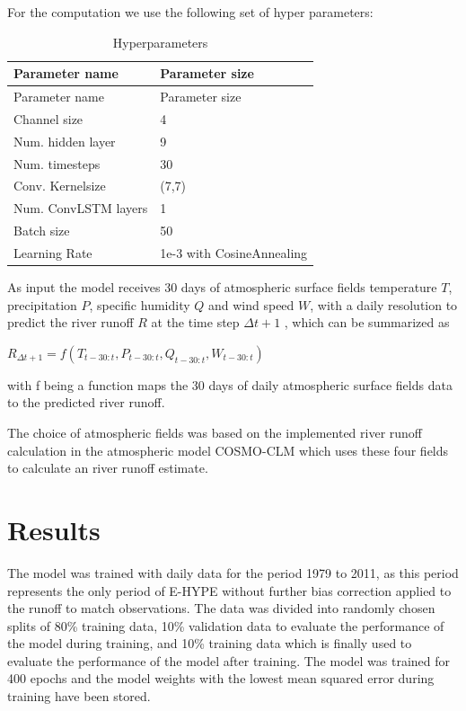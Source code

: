 \documentclass[
]{agujournal2019}
\begin{document}
For the computation we use the following set of hyper parameters:

\hypertarget{tbl-letters}{}
\begin{longtable}[]{@{}ll@{}}
\caption{\label{tbl-letters}Hyperparameters}\tabularnewline
\toprule()
Parameter name & Parameter size \\
\midrule()
\endfirsthead
\toprule()
Parameter name & Parameter size \\
\midrule()
\endhead
Channel size & 4 \\
Num. hidden layer & 9 \\
Num. timesteps & 30 \\
Conv. Kernelsize & (7,7) \\
Num. ConvLSTM layers & 1 \\
Batch size & 50 \\
Learning Rate & 1e-3 with CosineAnnealing \\
\bottomrule()
\end{longtable}

As input the model receives 30 days of atmospheric surface fields
temperature \(T\), precipitation \(P\), specific humidity \(Q\) and wind
speed \(W\), with a daily resolution to predict the river runoff \(R\)
at the time step \(\Delta t+1\) , which can be summarized as

\(R_{\Delta t+1} = f\left(T_{t-30:t}, P_{t-30:t}, Q_{t-30:t}, W_{t-30:t}\right)\)

with f being a function maps the 30 days of daily atmospheric surface
fields data to the predicted river runoff.

The choice of atmospheric fields was based on the implemented river
runoff calculation in the atmospheric model COSMO-CLM which uses these
four fields to calculate an river runoff estimate.

\hypertarget{results}{%
\section{Results}\label{results}}

The model was trained with daily data for the period 1979 to 2011, as
this period represents the only period of E-HYPE without further bias
correction applied to the runoff to match observations. The data was
divided into randomly chosen splits of 80\% training data, 10\%
validation data to evaluate the performance of the model during
training, and 10\% training data which is finally used to evaluate the
performance of the model after training. The model was trained for 400
epochs and the model weights with the lowest mean squared error during
training have been stored.
\end{document}
